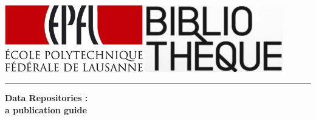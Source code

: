 \begin{titlepage}

\begin{center}
\begin{minipage}[!t]{0.66\textwidth}
\begin{center}
    \includegraphics[width=0.45\textwidth]{./images/epfl_logo.png}
    \includegraphics[width=0.45\textwidth]{./images/logo_biblio.png}  \\
\end{center}
\end{minipage}
\end{center}


\begin{center}


\hrule

\vspace{3cm}

{ \huge \bfseries Data Repositories : \\ a publication guide}


\end{center}
\end{titlepage}
